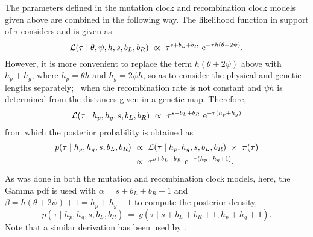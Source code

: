 The parameters defined in the mutation clock and recombination clock models given above are combined in the following way.
The likelihood function in support of $\tau$ considers  and is given as
\begin{equation*}
	\mathcal{L}(\tau \mid \theta,\psi,h,s,b_L,b_R)~\propto~\tau^{s+b_L+b_R} \,\,\mathrm{e}^{-\tau h(\theta+2\psi)}\text{.}
\end{equation*}
However, it is more convenient to replace the term ${h(\theta+2\psi)}$ above with ${h_p + h_g}$, where $h_p=\theta h$ and ${h_g=2\psi h}$, so as to consider the physical and genetic lengths separately; \eg~when the recombination rate is not constant and ${\psi h}$ is determined from the distances given in a genetic map.
Therefore,
\begin{equation}\label{eq:com_like}
	\mathcal{L}(\tau \mid h_p,h_g,s,b_L,b_R)~\propto~\tau^{s+b_L+b_R} \,\,\mathrm{e}^{-\tau  (h_p + h_g)}
\end{equation}
from which the posterior probability is obtained as
\begin{equation}
	\begin{split}
		p(\tau \mid h_p,h_g,s,b_L,b_R)
		&~\propto~
		\mathcal{L}(\tau \mid h_p,h_g,s,b_L,b_R)~\times~\pi(\tau) \\
		&~\propto~
		\tau^{s + b_L + b_R} \,\,\mathrm{e}^{-\tau(h_p + h_g + 1)}\text{.}
	\end{split}
\end{equation}
As was done in both the mutation and recombination clock models, here, the Gamma \gls{pdf} is used with ${\alpha = s + b_L + b_R +1}$ and ${\beta = h(\theta + 2\psi) +1 = h_p + h_g + 1}$
to compute the posterior density, \ie
\begin{equation}
	p(\tau \mid h_p,h_g,s,b_L,b_R)~=~g(\tau\mid s + b_L + b_R +1, h_p + h_g + 1)\text{.}
\end{equation}
Note that a similar derivation has been used by \citet{schroff2016}.



